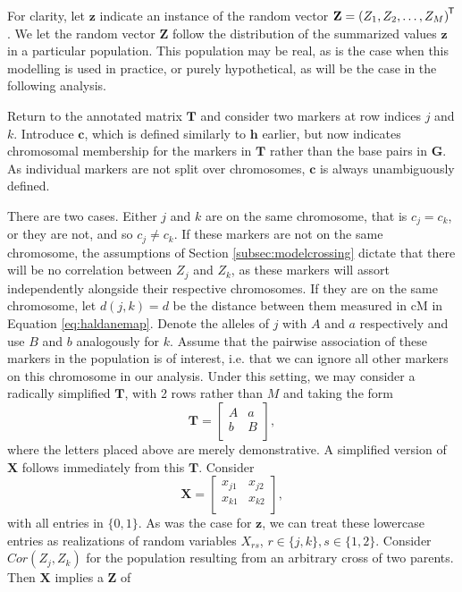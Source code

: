 \documentclass{article}
\newcommand{\ve}[1]{\mathbf{#1}}           %
\newcommand{\m}[1]{\mathbf{#1}}               %
\newcommand{\tr}[1]{{#1}^{\mkern-1.5mu\mathsf{T}}}              %
\begin{document}
For clarity, let $\ve{z}$ indicate an instance of the random vector $\ve{Z} = \tr{(Z_1, Z_2, \dots, Z_M)}$. We let the random vector $\ve{Z}$ follow the distribution of the summarized values $\ve{z}$ in a particular population. This population may be real, as is the case when this modelling is used in practice, or purely hypothetical, as will be the case in the following analysis.

Return to the annotated matrix $\m{T}$ and consider two markers at row indices $j$ and $k$. Introduce $\ve{c}$, which is defined similarly to $\ve{h}$ earlier, but now indicates chromosomal membership for the markers in $\m{T}$ rather than the base pairs in $\m{G}$. As individual markers are not split over chromosomes, $\ve{c}$ is always unambiguously defined.

There are two cases. Either $j$ and $k$ are on the same chromosome, that is $c_j = c_k$, or they are not, and so $c_j \neq c_k$. If these markers are not on the same chromosome, the assumptions of Section \ref{subsec:modelcrossing} dictate that there will be no correlation between $Z_j$ and $Z_k$, as these markers will assort independently alongside their respective chromosomes. If they are on the same chromosome, let $d(j,k) = d$ be the distance between them measured in cM in Equation \ref{eq:haldanemap}. Denote the alleles of $j$ with $A$ and $a$ respectively and use $B$ and $b$ analogously for $k$. Assume that the pairwise association of these markers in the population is of interest, i.e. that we can ignore all other markers on this chromosome in our analysis. Under this setting, we may consider a radically simplified $\m{T}$, with 2 rows rather than $M$ and taking the form
$$\m{T} = \begin{bmatrix}
  A & a \\
  b & B \\
\end{bmatrix},$$
where the letters placed above are merely demonstrative. A simplified version of $\m{X}$ follows immediately from this $\m{T}$. Consider
$$\m{X} = \begin{bmatrix}
  x_{j1} & x_{j2} \\
  x_{k1} & x_{k2} \\
\end{bmatrix},$$
with all entries in $\{0,1\}$. As was the case for $\ve{z}$, we can treat these lowercase entries as realizations of random variables $X_{rs}$, $r \in \{j,k\}, s \in \{1,2\}$. Consider $Cor(Z_j, Z_k)$ for the population resulting from an arbitrary cross of two parents. Then $\m{X}$ implies a $\ve{Z}$ of
\end{document}

